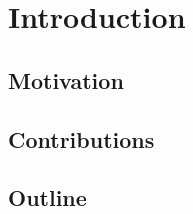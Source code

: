 \section{Introduction}\label{sec:introduction}

\subsection{Motivation}

\subsection{Contributions}

\subsection{Outline}
